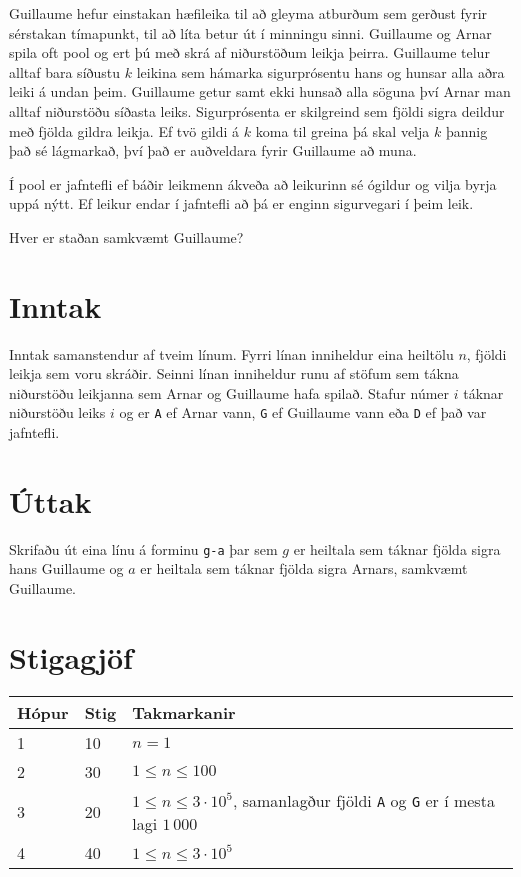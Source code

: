 
Guillaume hefur einstakan hæfileika til að gleyma atburðum sem gerðust fyrir sérstakan tímapunkt, til að líta betur út í minningu sinni.
Guillaume og Arnar spila oft pool og ert þú með skrá af niðurstöðum leikja þeirra.
Guillaume telur alltaf bara síðustu $k$ leikina sem hámarka sigurprósentu hans og hunsar alla aðra leiki á undan þeim.
Guillaume getur samt ekki hunsað alla söguna því Arnar man alltaf niðurstöðu síðasta leiks.
Sigurprósenta er skilgreind sem fjöldi sigra deildur með fjölda gildra leikja.
Ef tvö gildi á $k$ koma til greina þá skal velja $k$ þannig það sé lágmarkað, því það er auðveldara fyrir Guillaume að muna.

Í pool er jafntefli ef báðir leikmenn ákveða að leikurinn sé ógildur og vilja byrja uppá nýtt.
Ef leikur endar í jafntefli að þá er enginn sigurvegari í þeim leik.

Hver er staðan samkvæmt Guillaume?

\section*{Inntak}
Inntak samanstendur af tveim línum.
Fyrri línan inniheldur eina heiltölu $n$, fjöldi leikja sem voru skráðir.
Seinni línan inniheldur runu af stöfum sem tákna niðurstöðu leikjanna sem Arnar og Guillaume hafa spilað.
Stafur númer $i$ táknar niðurstöðu leiks $i$ og er \texttt{A} ef Arnar vann, \texttt{G} ef Guillaume vann eða \texttt{D} ef það var jafntefli.

\section*{Úttak}
Skrifaðu út eina línu á forminu \texttt{g-a} þar sem $g$ er heiltala sem táknar fjölda sigra hans Guillaume og $a$ er heiltala sem táknar fjölda sigra Arnars, samkvæmt Guillaume.

\section*{Stigagjöf}
\begin{tabular}{|l|l|l|}
\hline
Hópur & Stig & Takmarkanir \\ \hline
1     & 10   & $n = 1$ \\ \hline
2     & 30   & $1 \leq n \leq 100$ \\ \hline
3     & 20   & $1 \leq n \leq 3 \cdot 10^5$, samanlagður fjöldi \texttt{A} og \texttt{G} er í mesta lagi $1\,000$  \\ \hline
4     & 40   & $1 \leq n \leq 3 \cdot 10^5$ \\ \hline
\end{tabular}

